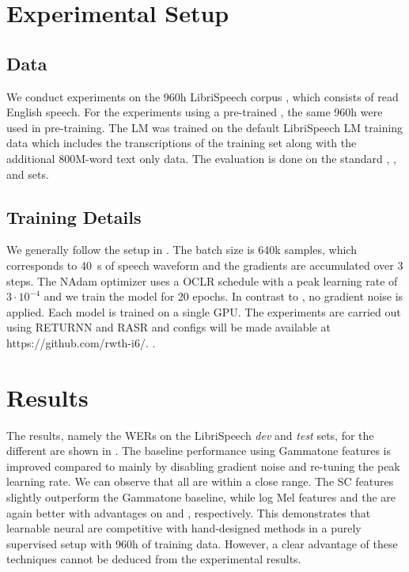 \documentclass{INTERSPEECH2023}
\begin{document}
\section{Experimental Setup}
\subsection{Data}
We conduct experiments on the 960h LibriSpeech corpus \cite{panayotov2015librispeech}, which consists of read English speech.
For the experiments using a pre-trained \wvtwo \fe, the same 960h were used in pre-training.
The \gls{LM} was trained on the default LibriSpeech \gls{LM} training data which includes the transcriptions of the training set along with the additional 800M-word text only data.
The evaluation is done on the standard \devclean, \devother, \testclean and \testother sets.

\subsection{Training Details}
We generally follow the setup in \cite{zhou2022efficient}.
The batch size is 640k samples, which corresponds to \SI{40}{\second} of speech waveform and the gradients are accumulated over 3 steps.
The NAdam optimizer uses a \gls{OCLR} schedule with a peak learning rate of $3\cdot 10^{-4}$ and we train the model for 20 epochs.
In contrast to \cite{zhou2022efficient}, no gradient noise is applied.
Each model is trained on a single \gls{GPU}.
The experiments are carried out using 
\ifinterspeechfinal
     RETURNN and RASR
\fi
and configs will be made available at
\ifinterspeechfinal
     https://github.com/rwth-i6/.
.
\fi

\section{Results}
The results, namely the \glspl{WER} on the LibriSpeech \textit{dev} and \textit{test} sets, for the different \fes are shown in .
The baseline performance using Gammatone features is improved compared to \cite{zhou2022efficient} mainly by disabling gradient noise and re-tuning the peak learning rate.
We can observe that all \fes are within a close range.
The \gls{SC} features slightly outperform the Gammatone baseline, while log Mel features and the \wvtwo \fe are again better with advantages on \devother and \testother, respectively.
This demonstrates that learnable neural \fes are competitive with hand-designed methods in a purely supervised setup with 960h of training data.
However, a clear advantage of these techniques cannot be deduced from the experimental results.
\end{document}
